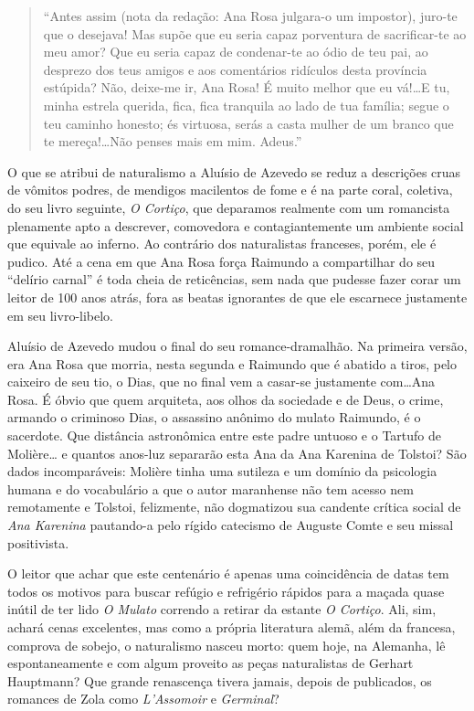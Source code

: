 \documentclass[
  letterpaper,
  DIV=11,
  numbers=noendperiod]{scrreprt}
\begin{document}
\begin{quote}
``Antes assim (nota da redação: Ana Rosa julgara-o um impostor), juro-te
que o desejava! Mas supõe que eu seria capaz porventura de sacrificar-te
ao meu amor? Que eu seria capaz de condenar-te ao ódio de teu pai, ao
desprezo dos teus amigos e aos comentários ridículos desta província
estúpida? Não, deixe-me ir, Ana Rosa! É muito melhor que eu vá!\ldots E
tu, minha estrela querida, fica, fica tranquila ao lado de tua família;
segue o teu caminho honesto; és virtuosa, serás a casta mulher de um
branco que te mereça!\ldots Não penses mais em mim. Adeus.''
\end{quote}

O que se atribui de naturalismo a Aluísio de Azevedo se reduz a
descrições cruas de vômitos podres, de mendigos macilentos de fome e é
na parte coral, coletiva, do seu livro seguinte, \emph{O Cortiço}, que
deparamos realmente com um romancista plenamente apto a descrever,
comovedora e contagiantemente um ambiente social que equivale ao
inferno. Ao contrário dos naturalistas franceses, porém, ele é pudico.
Até a cena em que Ana Rosa força Raimundo a compartilhar do seu
``delírio carnal'' é toda cheia de reticências, sem nada que pudesse
fazer corar um leitor de 100 anos atrás, fora as beatas ignorantes de
que ele escarnece justamente em seu livro-libelo.

Aluísio de Azevedo mudou o final do seu romance-dramalhão. Na primeira
versão, era Ana Rosa que morria, nesta segunda e Raimundo que é abatido
a tiros, pelo caixeiro de seu tio, o Dias, que no final vem a casar-se
justamente com\ldots Ana Rosa. É óbvio que quem arquiteta, aos olhos da
sociedade e de Deus, o crime, armando o criminoso Dias, o assassino
anônimo do mulato Raimundo, é o sacerdote. Que distância astronômica
entre este padre untuoso e o Tartufo de Molière\ldots{} e quantos
anos-luz separarão esta Ana da Ana Karenina de Tolstoi? São dados
incomparáveis: Molière tinha uma sutileza e um domínio da psicologia
humana e do vocabulário a que o autor maranhense não tem acesso nem
remotamente e Tolstoi, felizmente, não dogmatizou sua candente crítica
social de \emph{Ana Karenina} pautando-a pelo rígido catecismo de
Auguste Comte e seu missal positivista.

O leitor que achar que este centenário é apenas uma coincidência de
datas tem todos os motivos para buscar refúgio e refrigério rápidos para
a maçada quase inútil de ter lido \emph{O Mulato} correndo a retirar da
estante \emph{O Cortiço}. Ali, sim, achará cenas excelentes, mas como a
própria literatura alemã, além da francesa, comprova de sobejo, o
naturalismo nasceu morto: quem hoje, na Alemanha, lê espontaneamente e
com algum proveito as peças naturalistas de Gerhart Hauptmann? Que
grande renascença tivera jamais, depois de publicados, os romances de
Zola como \emph{L'Assomoir} e \emph{Germinal}?
\end{document}
